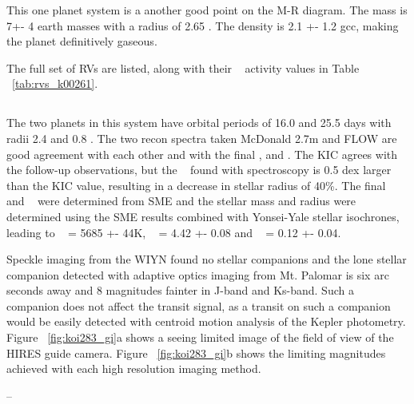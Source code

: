 \documentclass{emulateapj}
\begin{document}


This one planet system is a another good point on the M-R diagram. The mass is 7+- 4 earth masses with a radius of 2.65 \rearthe. The density is 2.1 +- 1.2 gcc, making the planet definitively gaseous.

The full set of RVs are listed, along with their \rphk~ activity values in Table ~\ref{tab:rvs_k00261}.



\subsection{\koitwoeightthree} %

The two planets in this system have orbital periods of 16.0 and 25.5 days with radii 2.4 and 0.8 \rearthe. The two recon spectra taken McDonald 2.7m and FLOW are good agreement with each other and with the final \teff, and \logg. The KIC \teff agrees with the follow-up observations, but the \logg~ found with spectroscopy is 0.5 dex  larger than the KIC value, resulting in a decrease in stellar radius of 40\%. The final \teff~ and \logg~ were determined from SME and the stellar mass and radius were determined using the SME results combined with Yonsei-Yale stellar isochrones, leading to \teff~ = 5685 +- 44K, \logg~ = 4.42 +- 0.08 and \feh~ = 0.12 +- 0.04.

Speckle imaging from the WIYN  found no stellar companions and  the lone stellar companion detected with adaptive optics imaging from Mt. Palomar is six arc seconds away and 8 magnitudes fainter in J-band and Ks-band. Such a companion does not affect the transit signal, as a transit on such a companion would be easily detected with centroid motion analysis of the Kepler photometry. Figure ~\ref{fig:koi283_gi}a shows a seeing limited  image of the field of view of the HIRES guide camera.  Figure ~\ref{fig:koi283_gi}b shows the limiting magnitudes achieved with each high resolution imaging method. 

--
\end{document}
